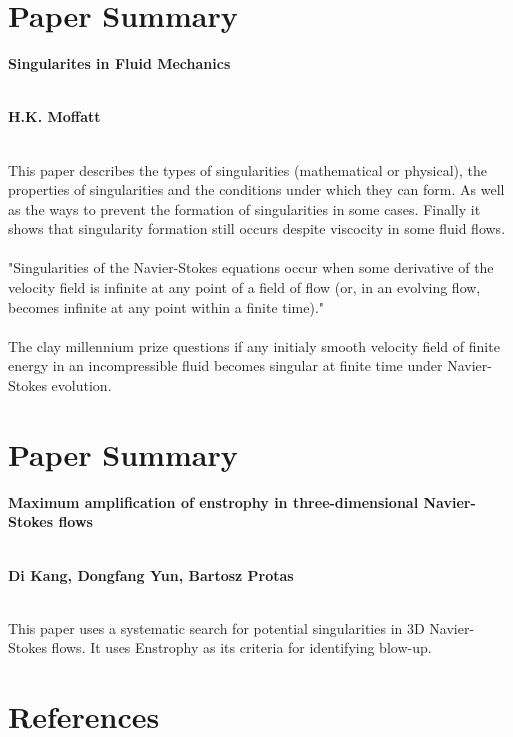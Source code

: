 \documentclass[12pt]{article}
\begin{document}
\begin{flushleft}
\section{Paper Summary}
\begin{center}
\begin{large}
\textbf{Singularites in Fluid Mechanics}
\\~\\
\end{large}
\textbf{H.K. Moffatt}
\\~\\
\end{center}
This paper describes the types of singularities (mathematical or physical), the properties of singularities and the conditions under which they can form. As well as the ways to prevent the formation of singularities in some cases. Finally it shows that singularity formation still occurs despite viscocity in some fluid flows.
\\~\\
"Singularities of the Navier-Stokes equations occur when some derivative of the velocity
field is infinite at any point of a field of flow (or, in an evolving flow, becomes infinite
at any point within a finite time)."
\\~\\
The clay millennium prize questions if any initialy smooth velocity field of finite energy in an incompressible fluid becomes singular at finite time under Navier-Stokes evolution. 

\section{Paper Summary}
\begin{center}
\begin{large}
\textbf{Maximum amplification of enstrophy in three-dimensional Navier-Stokes flows}
\\~\\
\end{large}
\textbf{Di Kang, Dongfang Yun, Bartosz Protas}
\\~\\
\end{center}
\qquad This paper uses a systematic search for potential singularities in 3D Navier-Stokes flows. It uses Enstrophy as its criteria for identifying blow-up.

\section{References}

\end{flushleft}
\end{document}
